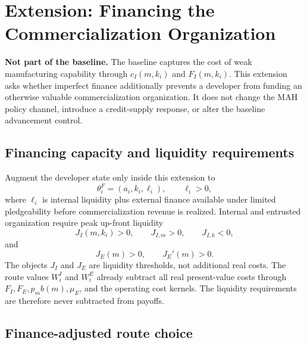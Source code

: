 \section{Extension: Financing the Commercialization Organization}
\label{sec:ext-financing-commercialization}

\noindent\textbf{Not part of the baseline.}
The baseline captures the cost of weak manufacturing capability through
\(c_I(m,k_i)\) and \(F_I(m,k_i)\). This extension asks whether imperfect
finance additionally prevents a developer from funding an otherwise valuable
commercialization organization. It does not change the MAH policy channel,
introduce a credit-supply response, or alter the baseline advancement control.

\subsection{Financing capacity and liquidity requirements}

Augment the developer state only inside this extension to
\begin{equation}
  \theta_i^F=(a_i,k_i,\ell_i),
  \qquad \ell_i>0,
  \label{eq:ext-finance-type}
\end{equation}
where \(\ell_i\) is internal liquidity plus external finance available under
limited pledgeability before commercialization revenue is realized. Internal
and entrusted organization require peak up-front liquidity
\begin{equation}
  J_I(m,k_i)>0,
  \qquad J_{I,m}>0,
  \qquad J_{I,k}<0,
  \label{eq:ext-internal-liquidity}
\end{equation}
and
\begin{equation}
  J_E(m)>0,
  \qquad J_E'(m)>0.
  \label{eq:ext-entrusted-liquidity}
\end{equation}
The objects \(J_I\) and \(J_E\) are liquidity thresholds, not additional
real costs. The route values \(W_i^I\) and \(W_i^E\) already subtract all
real present-value costs through \(F_I,F_E,p_mb(m),\mu_E\), and the operating
cost kernels. The liquidity requirements are therefore never subtracted from
payoffs.

\subsection{Finance-adjusted route choice}

